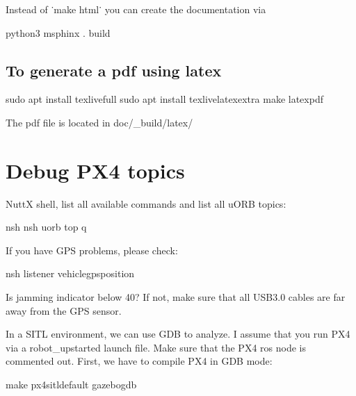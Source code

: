 \documentclass[letterpaper,10pt,english]{sphinxmanual}
\begin{document}
Instead of ˙make html˙ you can create the documentation via

\begin{sphinxVerbatim}[commandchars=\\\{\}]
python3 \PYGZhy{}msphinx . \PYGZus{}build
\end{sphinxVerbatim}


\subsection{To generate a pdf using latex}
\label{\detokenize{source/howtos/compile_documentation:to-generate-a-pdf-using-latex}}
\begin{sphinxVerbatim}[commandchars=\\\{\}]
sudo apt install texlive\PYGZhy{}full
sudo apt install texlive\PYGZhy{}latex\PYGZhy{}extra
make latexpdf
\end{sphinxVerbatim}

The pdf file is located in doc/\_build/latex/


\section{Debug PX4 topics}
\label{\detokenize{source/howtos/debug_px4:debug-px4-topics}}\label{\detokenize{source/howtos/debug_px4::doc}}
NuttX shell, list all available commands and list all uORB topics:

\begin{sphinxVerbatim}[commandchars=\\\{\}]
nsh\PYGZgt{} 
nsh\PYGZgt{} uorb top
q
\end{sphinxVerbatim}

If you have GPS problems, please check:

\begin{sphinxVerbatim}[commandchars=\\\{\}]
nsh\PYGZgt{} listener vehicle\PYGZus{}gps\PYGZus{}position
\end{sphinxVerbatim}

Is jamming indicator below 40? If not, make sure that all USB3.0 cables are far away from the GPS sensor.

In a SITL environment, we can use GDB to analyze. I assume that you run PX4 via a robot\_upstarted launch file. Make sure that the PX4 ros node is commented out. First, we have to compile PX4 in GDB mode:

\begin{sphinxVerbatim}[commandchars=\\\{\}]
 make px4\PYGZus{}sitl\PYGZus{}default gazebo\PYGZus{}\PYGZus{}\PYGZus{}gdb
\end{sphinxVerbatim}
\end{document}

